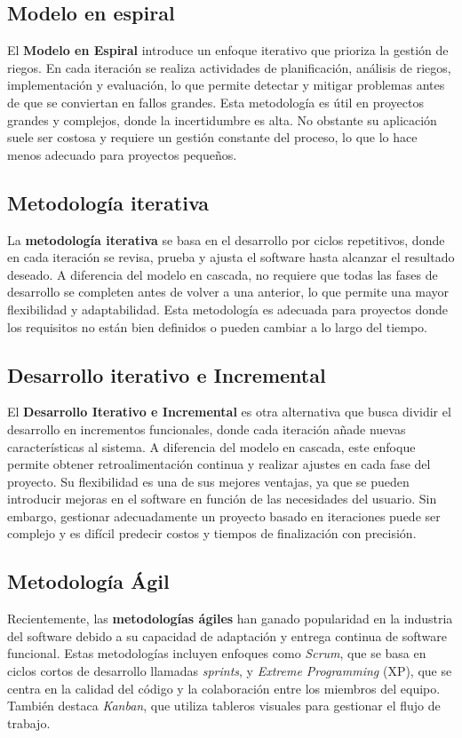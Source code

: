 \subsection{Modelo en espiral}
\label{subsec:espiral}

El \textbf{Modelo en Espiral} introduce un enfoque iterativo que prioriza la gestión de riegos. En cada iteración se realiza actividades
de planificación, análisis de riegos, implementación y evaluación, lo que permite detectar y mitigar problemas antes de que se conviertan en fallos grandes. 
Esta metodología es útil en proyectos grandes y complejos, donde la incertidumbre es alta. No obstante su aplicación suele ser costosa y requiere un gestión constante del proceso,
lo que lo hace menos adecuado para proyectos pequeños. \cite{boehm1988}

\subsection{Metodología iterativa}
La \textbf{metodología iterativa} se basa en el desarrollo por ciclos repetitivos, donde en cada iteración se revisa, prueba y ajusta el software 
hasta alcanzar el resultado deseado. A diferencia del modelo en cascada, no requiere que todas las fases de desarrollo se completen antes de volver a una anterior, lo que permite
una mayor flexibilidad y adaptabilidad. Esta metodología es adecuada para proyectos donde los requisitos no están bien definidos o pueden cambiar a lo largo del tiempo. \cite{atlassian_iterative}


\subsection{Desarrollo iterativo e Incremental}
\label{subsec:iterativo}
El \textbf{Desarrollo Iterativo e Incremental} es otra alternativa que busca dividir el desarrollo en incrementos funcionales, donde cada iteración añade nuevas características al sistema. 
A diferencia del modelo en cascada, este enfoque permite obtener retroalimentación continua y realizar ajustes en cada fase del proyecto. Su flexibilidad es una de sus mejores 
ventajas, ya que se pueden introducir mejoras en el software en función  de las necesidades del usuario. Sin embargo, gestionar adecuadamente un proyecto basado en 
iteraciones puede ser complejo y es difícil predecir costos y tiempos de finalización con precisión. \cite{larman2003}

\subsection{Metodología Ágil}
\label{subsec:agil}
Recientemente, las \textbf{metodologías ágiles} han ganado popularidad en la industria del software debido a su
capacidad de adaptación y entrega continua de software funcional. Estas metodologías incluyen enfoques como \textit{Scrum}, 
que se basa en ciclos cortos de desarrollo llamadas \textit{sprints}, y \textit{Extreme Programming} (XP), que se centra en la calidad del código y la colaboración entre los miembros del equipo.
También destaca \textit{Kanban}, que utiliza tableros visuales para gestionar el flujo de trabajo. \cite{beck1999}

